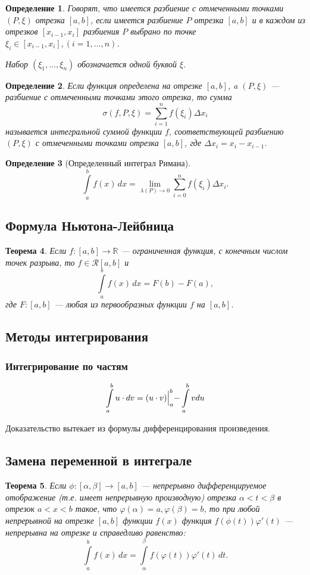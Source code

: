 \documentclass[12pt]{report}
\theoremstyle{plain}
\newtheorem{theorem}{Теорема}[chapter]
\newtheorem{definition}[theorem]{Определение}
\newcommand{\R}{\mathbb R}
\newcommand{\Ri}{\mathcal R}
\begin{document}
\begin{definition}
Говорят, что имеется разбиение с отмеченными точками $(P, \xi)$ отрезка $[a, b]$,
если имеется разбиение $P$ отрезка $[a, b]$ и в каждом из отрезков $[x_{i-1}, x_i]$
разбиения $P$ выбрано по точке $\xi_i \in [x_{i-1}, x_i], (i=1, \dots, n)$.

Набор $(\xi_1, \dots, \xi_n)$ обозначается одной буквой $\xi$.
\end{definition}

\begin{definition}
Если функция определена на отрезке $[a, b]$, a $(P, \xi)$ --- разбиение с отмеченными
точками этого отрезка, то сумма
$$
\sigma(f, P, \xi) = \sum\limits_{i=1}^{n} f(\xi_i) \Delta x_i
$$
называется интегральной суммой функции $f$, соответствующей разбиению $(P, \xi)$
с отмеченными точками отрезка $[a, b]$, где $\Delta x_i = x_i - x_{i-1}$.
\end{definition}

\begin{definition}[Определенный интеграл Римана]
$$
\int\limits_{a}^{b} f(x) \, dx = \lim\limits_{\lambda(P) \rightarrow 0} \sum\limits_{i=0}^{n} f(\xi_i) \Delta x_i.
$$
\end{definition}

\subsection{Формула Ньютона-Лейбница}
\begin{theorem}
Если $f: [a, b] \rightarrow \R$ --- ограниченная функция, с конечным числом точек разрыва,
то $f \in \Ri [a, b]$ и
$$
\int\limits_a^b f(x)\,dx = F(b) - F(a),
$$
где $F: [a, b]$ --- любая из первообразных функции $f$ на $[a, b]$.
\end{theorem}

\subsection{Методы интегрирования}
\subsubsection{Интегрирование по частям}
$$
\int\limits_a^b u \cdot d v = (u\cdot v) \Bigl |_a^b - \int\limits_a^b v du
$$

Доказательство вытекает из формулы дифференцирования произведения.

\subsection{Замена переменной в интеграле}
\begin{theorem}
Если $\phi: [\alpha, \beta] \rightarrow [a, b]$ --- непрерывно дифференцируемое отображение
(т.е. имеет непрерывную производную) отрезка $\alpha < t < \beta$ в отрезок $a < x < b$ такое,
что $\varphi(\alpha) = a, \varphi(\beta) = b$, то при любой непрерывной на отрезке $[a, b]$ функции
$f(x)$ функция $f(\phi(t))\varphi'(t)$ --- непрерывна на отрезке и справедливо равенство:
$$
\int\limits_a^b f(x) \, dx = \int\limits_\alpha^\beta f(\varphi(t)) \varphi'(t)\, dt.
$$
\end{theorem}
\end{document}
